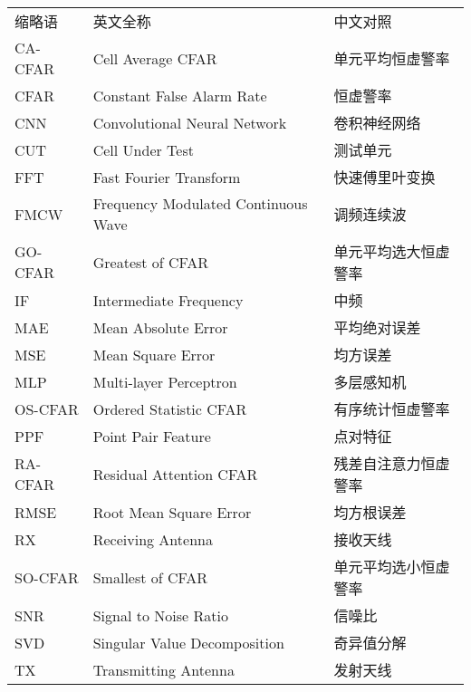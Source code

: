 \begin{center}
{
\renewcommand{\arraystretch}{1.28}
\begin{tabular}{p{2.5cm}p{6cm}l}
    缩略语 & 英文全称 &  中文对照 \\
    CA-CFAR &  Cell Average CFAR& 单元平均恒虚警率\\
    CFAR &Constant False Alarm Rate &恒虚警率\\
    CNN & Convolutional Neural Network & 卷积神经网络 \\
    CUT & Cell Under Test & 测试单元\\
    FFT & Fast Fourier Transform & 快速傅里叶变换 \\
    FMCW & Frequency Modulated Continuous Wave & 调频连续波 \\
    GO-CFAR &  Greatest of CFAR & 单元平均选大恒虚警率\\
    IF & Intermediate Frequency & 中频 \\
    MAE & Mean Absolute Error & 平均绝对误差\\
    MSE& Mean Square Error& 均方误差\\
    MLP&  Multi-layer Perceptron & 多层感知机\\
    OS-CFAR &  Ordered Statistic CFAR & 有序统计恒虚警率\\
    PPF & Point Pair Feature & 点对特征\\
    RA-CFAR &  Residual Attention CFAR & 残差自注意力恒虚警率\\
    RMSE & Root Mean Square Error & 均方根误差\\
    RX & Receiving Antenna & 接收天线\\
    SO-CFAR &  Smallest of CFAR & 单元平均选小恒虚警率\\
    SNR & Signal to Noise Ratio & 信噪比\\
    SVD & Singular Value Decomposition & 奇异值分解\\
    TX & Transmitting Antenna & 发射天线\\
\end{tabular}
}
\end{center}